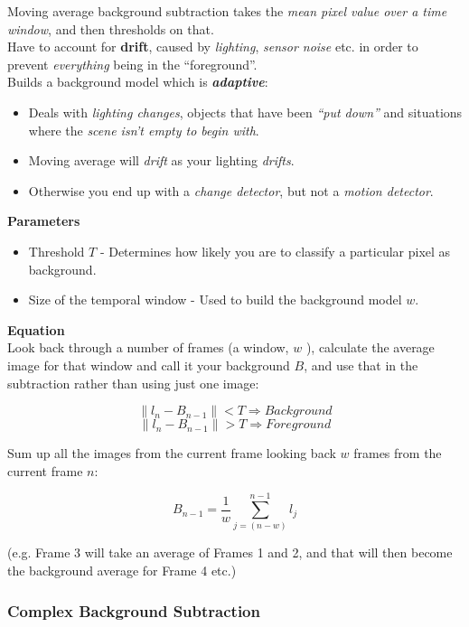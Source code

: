 \documentclass[english, 10pt]{article}
\begin{document}
Moving average background subtraction takes the \textit{mean pixel value over a time window}, and then thresholds on that. \\

Have to account for \textbf{drift}, caused by \emph{lighting},
\emph{sensor noise} etc. in order to prevent \emph{everything} being in
the ``foreground''. \\

Builds a background model which is \textbf{\emph{adaptive}}:

\begin{itemize}
\item
  Deals with \textit{lighting changes}, objects that have been \textit{``put down''} and
  situations where the \textit{scene isn't empty to begin with}.
\item Moving average will \textit{drift} as your lighting \textit{drifts}.  
   \item Otherwise you
  end up with a \emph{change detector}, but not a \emph{motion
  detector}.
\end{itemize}

\textbf{Parameters}

\begin{itemize}
\item
  Threshold $T$ - Determines how likely you are to classify a particular pixel as background.
  
   \item Size of the temporal window - Used to build the background model $w$.
\end{itemize}

\textbf{Equation} \\

Look back through a number of frames (a window, $w$ ), calculate the average image for that window and call it your background $B$, and use that in the subtraction rather than using just one image:

$$ \| l_n - B_{n-1} \| < T \Longrightarrow Background$$
$$ \| l_n - B_{n-1} \| > T \Longrightarrow Foreground$$

Sum up all the images from the current frame looking back $w$ frames from the current frame $n$:

$$  B_{n-1} = \frac{1}{w}\sum_{j=(n-w)}^{n-1}l_j $$

(e.g. Frame 3 will take an average of Frames 1 and 2, and that will then become the background average for Frame 4 etc.)

\subsubsection{Complex Background Subtraction}
\end{document}
